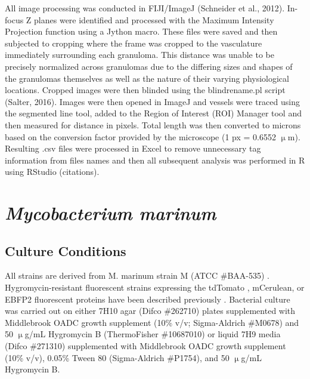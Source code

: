 All image processing was conducted in FIJI/ImageJ (Schneider et al., 2012). In-focus Z planes were identified and processed with the Maximum Intensity Projection function using a Jython macro. These files were saved and then subjected to cropping where the frame was cropped to the vasculature immediately surrounding each granuloma. This distance was unable to be precisely normalized across granulomas due to the differing sizes and shapes of the granulomas themselves as well as the nature of their varying physiological locations. Cropped images were then blinded using the blindrename.pl script (Salter, 2016). Images were then opened in ImageJ and vessels were traced using the segmented line tool, added to the Region of Interest (ROI) Manager tool and then measured for distance in pixels. Total length was then converted to microns based on the conversion factor provided by the microscope (1 px = 0.6552 $\upmu$m). Resulting .csv files were processed in Excel to remove unnecessary tag information from files names and then all subsequent analysis was performed in R using RStudio (citations).






\section{\textit{Mycobacterium marinum}}



\subsection{Culture Conditions}

All strains are derived from M. marinum strain M (ATCC \#BAA-535) \citep{Ramakrishnan1994}. Hygromycin-resistant fluorescent strains expressing the tdTomato \citep{Oehlers2015} , mCerulean, or EBFP2 fluorescent proteins have been described previously \citep{Takaki2013}. Bacterial culture was carried out on either 7H10 agar (Difco \#262710) plates supplemented with Middlebrook OADC growth supplement (10\% v/v; Sigma-Aldrich \#M0678) and 50 $\upmu$g/mL Hygromycin B (ThermoFisher \#10687010) or liquid 7H9 media (Difco \#271310) supplemented with Middlebrook OADC growth supplement (10\% v/v), 0.05\% Tween 80 (Sigma-Aldrich \#P1754), and 50 $\upmu$g/mL Hygromycin B. 

